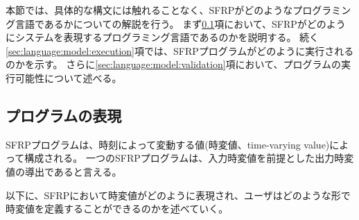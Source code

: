 本節では、具体的な構文には触れることなく、SFRPがどのようなプログラミング言語であるかについての解説を行う。
まず\ref{sec:language:model:program}項において、SFRPがどのようにシステムを表現するプログラミング言語であるのかを説明する。
続く\ref{sec:language:model:execution}項では、SFRPプログラムがどのように実行されるのかを示す。
さらに\ref{sec:language:model:validation}項において、プログラムの実行可能性について述べる。

\subsection{プログラムの表現}\label{sec:language:model:program}
SFRPプログラムは、時刻によって変動する値(時変値、time-varying value)によって構成される。
一つのSFRPプログラムは、入力時変値を前提とした出力時変値の導出であると言える。

以下に、SFRPにおいて時変値がどのように表現され、ユーザはどのような形で時変値を定義することができるのかを述べていく。

